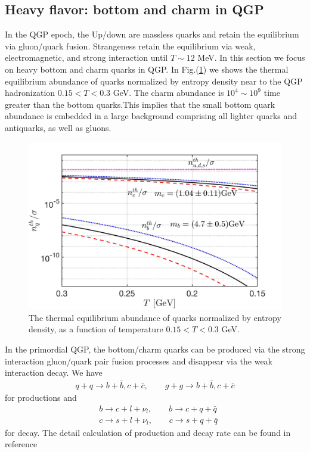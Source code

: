 \documentclass[universe,article,submit,moreauthors,pdftex,a4paper]{Definitions/mdpi}
\newcommand*{\xblue}{\color{blue}}
\begin{document}
\subsection{Heavy flavor: bottom and charm in QGP}
In the QGP epoch, the Up/down are massless quarks and retain the equilibrium via gluon/quark fusion. Strangeness retain the equilibrium via weak, electromagnetic, and strong interaction until $T\sim12$ MeV. In this section we focus on heavy bottom and charm quarks in QGP. In Fig.(\ref{bcDensity_fig}) we shows the thermal equilibrium abundance of quarks normalized by entropy density near to the QGP hadronization $0.15<T<0.3$ GeV. The charm abundance is $10^4\sim10^9$ time greater than the bottom quarks.This implies that the small bottom quark abundance is embedded in a large background comprising all lighter quarks and antiquarks, as well as gluons.

\begin{figure} %
\centering
\includegraphics[width=\linewidth]{bcQuarkDensity_new.jpg}
\caption{
The thermal equilibrium abundance of quarks normalized by entropy density, as a function of temperature $0.15<T<0.3$ GeV.}
\label{bcDensity_fig}
\end{figure}

In the primordial QGP, the bottom/charm quarks can be produced via the strong interaction gluon/quark pair fusion processes and disappear via the weak interaction decay. We have
\begin{align}
    q+q\longrightarrow b+\bar b, c+\bar c,\qquad g+g\longrightarrow b+\bar b, c+\bar c
\end{align}
for productions and 
\begin{align}
    &b\longrightarrow c+l+\nu_l, \qquad b\longrightarrow c+q+\bar{q}\\
&c\longrightarrow s+l+\nu_l,\qquad c\longrightarrow s+q+\bar{q}
\end{align}
for decay. The detail calculation of production and decay rate can be found in {\xblue reference}
\end{document}
